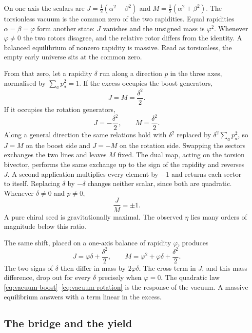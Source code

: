 \documentclass[a4paper]{article}
\begin{document}
On one axis the scalars are $J=\tfrac12(\alpha^2-\beta^2)$ and $M=\tfrac12(\alpha^2+\beta^2)$. The torsionless vacuum is the common zero of the two rapidities. Equal rapidities $\alpha=\beta=\varphi$ form another state: $J$ vanishes and the unsigned mass is $\varphi^2$. Whenever $\varphi\neq 0$ the two rotors disagree, and the relative rotor differs from the identity. A balanced equilibrium of nonzero rapidity is massive. Read as torsionless, the empty early universe sits at the common zero.

From that zero, let a rapidity $\delta$ run along a direction $p$ in the three axes, normalised by $\sum_a p_a^2=1$. If the excess occupies the boost generators,
\begin{equation}
\label{eq:vacuum-boost}
J=M=\frac{\delta^2}{2}.
\end{equation}
If it occupies the rotation generators,
\begin{equation}
\label{eq:vacuum-rotation}
J=-\frac{\delta^2}{2},\qquad M=\frac{\delta^2}{2}.
\end{equation}
Along a general direction the same relations hold with $\delta^2$ replaced by $\delta^2\sum_a p_a^2$, so $J=M$ on the boost side and $J=-M$ on the rotation side. Swapping the sectors exchanges the two lines and leaves $M$ fixed. The dual map, acting on the torsion bivector, performs the same exchange up to the sign of the rapidity and reverses $J$. A second application multiplies every element by $-1$ and returns each sector to itself. Replacing $\delta$ by $-\delta$ changes neither scalar, since both are quadratic. Whenever $\delta\neq 0$ and $p\neq 0$,
\[
\frac{J}{M}=\pm 1.
\]
A pure chiral seed is gravitationally maximal. The observed $\eta$ lies many orders of magnitude below this ratio.

The same shift, placed on a one-axis balance of rapidity $\varphi$, produces
\begin{equation}
\label{eq:balanced-shift}
J=\varphi\delta+\frac{\delta^2}{2},\qquad
M=\varphi^2+\varphi\delta+\frac{\delta^2}{2}.
\end{equation}
The two signs of $\delta$ then differ in mass by $2\varphi\delta$. The cross term in $J$, and this mass difference, drop out for every $\delta$ precisely when $\varphi=0$. The quadratic law \eqref{eq:vacuum-boost}--\eqref{eq:vacuum-rotation} is the response of the vacuum. A massive equilibrium answers with a term linear in the excess.

\subsection{The bridge and the yield}
\end{document}
